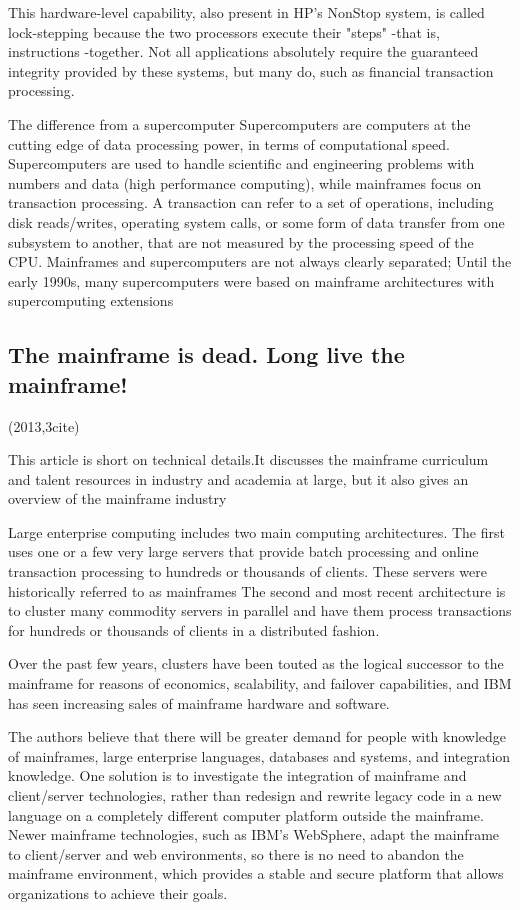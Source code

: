 \documentclass[a4paper,twoside]{scrbook}
\begin{document}
This hardware-level capability, also present in HP's NonStop system, is called lock-stepping because the two processors execute their "steps" -that is, instructions -together.
Not all applications absolutely require the guaranteed integrity provided by these systems, but many do, such as financial transaction processing.
\par
The difference from a supercomputer
Supercomputers are computers at the cutting edge of data processing power, in terms of computational speed. Supercomputers are used to handle scientific and engineering problems with numbers and data (high performance computing), while mainframes focus on transaction processing.
A transaction can refer to a set of operations, including disk reads/writes, operating system calls, or some form of data transfer from one subsystem to another, that are not measured by the processing speed of the CPU.
Mainframes and supercomputers are not always clearly separated; Until the early 1990s, many supercomputers were based on mainframe architectures with supercomputing extensions

\subsection{The mainframe is dead. Long live the mainframe!\cite{sagers2013mainframe}}
(2013,3cite)\par
This article is short on technical details.It discusses the mainframe curriculum and talent resources in industry and academia at large, but it also gives an overview of the mainframe industry
\par
Large enterprise computing includes two main computing architectures.
The first uses one or a few very large servers that provide batch processing and online transaction processing to hundreds or thousands of clients. These servers were historically referred to as mainframes
The second and most recent architecture is to cluster many commodity servers in parallel and have them process transactions for hundreds or thousands of clients in a distributed fashion.
\par
Over the past few years, clusters have been touted as the logical successor to the mainframe for reasons of economics, scalability, and failover capabilities, and IBM has seen increasing sales of mainframe hardware and software.
\par
The authors believe that there will be greater demand for people with knowledge of mainframes, large enterprise languages, databases and systems, and integration knowledge.
One solution is to investigate the integration of mainframe and client/server technologies, rather than redesign and rewrite legacy code in a new language on a completely different computer platform outside the mainframe.
Newer mainframe technologies, such as IBM's WebSphere, adapt the mainframe to client/server and web environments, so there is no need to abandon the mainframe environment, which provides a stable and secure platform that allows organizations to achieve their goals.
\end{document}
